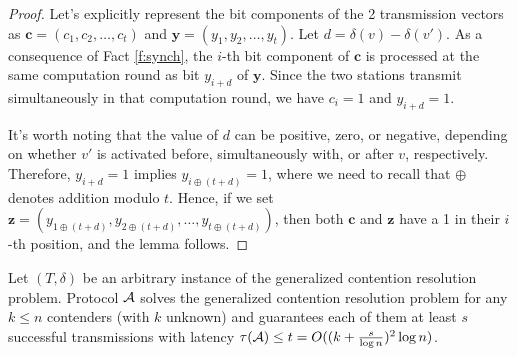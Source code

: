 \documentclass[11pt]{article}
\begin{document}
\begin{proof}
Let's explicitly represent the bit components of the 2 transmission vectors as $\mathbf{c} = (c_1, c_2, \ldots, c_t)$ and $\mathbf{y} = (y_1, y_2, \ldots, y_t)$.
Let $d = \delta(v) - \delta(v')$.
As a consequence of Fact \ref{f:synch}, the $i$-th bit component
of $\mathbf{c}$
is processed at the same computation round as bit $y_{i+ d}$ of
$\mathbf{y}$.
Since the two stations transmit simultaneously in that computation round, we have $c_i = 1$ and $y_{i+d} = 1$. 

It's worth noting that the value of $d$ can be positive, zero, or negative, depending on whether $v'$ is activated before, simultaneously with, or after $v$, respectively.
Therefore, $y_{i+d} = 1$ implies $y_{i \oplus (t+d)} = 1$, where we need to recall that $\oplus$ denotes addition modulo $t$. 
Hence, if we set
$\mathbf{z} = (y_{1 \oplus (t+d)}, y_{2 \oplus (t+d)}, \ldots, y_{t \oplus (t+d)})$,
then both $\mathbf{c}$ and $\mathbf{z}$ have a 1 in their $i$-th position, and the lemma follows.
\end{proof}

\begin{theorem}
\label{thm:codes-vs-CR}
Let $(T, \delta)$ be an arbitrary instance of the generalized contention resolution problem. 
Protocol ${\cal A}$ solves the generalized contention resolution problem for any $k\le n$ contenders (with $k$ unknown) and guarantees each of them at least $s$ successful transmissions 
with latency {$\tau({\cal A}) \leq t = O((k+\frac{s}{\log n})^2\log n)$.}
\end{theorem}
\end{document}
